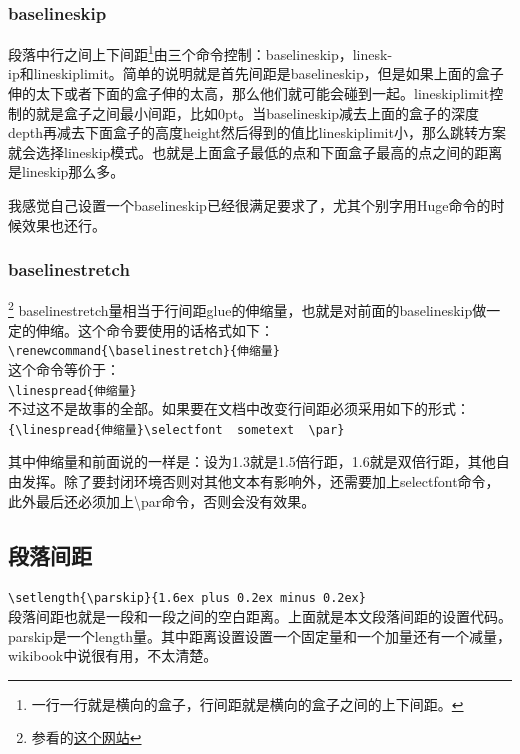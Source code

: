 \documentclass[12pt,oneside]{book}
\begin{document}
\begin{common-format}
\subsubsection{baselineskip} 
段落中行之间上下间距\footnote{一行一行就是横向的盒子，行间距就是横向的盒子之间的上下间距。}由三个命令控制：baselineskip，linesk-\\ip和lineskiplimit。简单的说明就是首先间距是baselineskip，但是如果上面的盒子伸的太下或者下面的盒子伸的太高，那么他们就可能会碰到一起。lineskiplimit控制的就是盒子之间最小间距，比如0pt。当baselineskip减去上面的盒子的深度depth再减去下面盒子的高度height然后得到的值比lineskiplimit小，那么跳转方案就会选择lineskip模式。也就是上面盒子最低的点和下面盒子最高的点之间的距离是lineskip那么多。

我感觉自己设置一个baselineskip已经很满足要求了，尤其个别字用Huge命令的时候效果也还行。


\subsubsection{baselinestretch}\footnote{参看的\href{http://tex.stackexchange.com/questions/49596/no-effect-of-baselinestretch}{这个网站}}
baselinestretch量相当于行间距glue的伸缩量，也就是对前面的baselineskip做一定的伸缩。这个命令要使用的话格式如下：\\
\verb+\renewcommand{\baselinestretch}{伸缩量}+\\
这个命令等价于：\\
\verb+\linespread{伸缩量}+\\
不过这不是故事的全部。如果要在文档中改变行间距必须采用如下的形式：\\
\verb+{\linespread{伸缩量}\selectfont  sometext  \par}+

{\linespread{3} \selectfont 其中伸缩量和前面说的一样是：设为1.3就是1.5倍行距，1.6就是双倍行距，其他自由发挥。除了要封闭环境否则对其他文本有影响外，还需要加上selectfont命令，此外最后还必须加上\textbackslash par命令，否则会没有效果。\par}



\subsection{段落间距}
\verb+\setlength{\parskip}{1.6ex plus 0.2ex minus 0.2ex}+\\
段落间距也就是一段和一段之间的空白距离。上面就是本文段落间距的设置代码。parskip是一个length量。其中距离设置设置一个固定量和一个加量还有一个减量，wikibook中说很有用，不太清楚。



\end{common-format}
\end{document}
